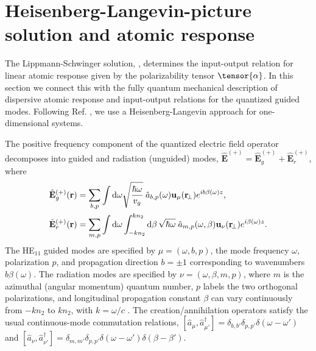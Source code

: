 \documentclass[preprint, aps,pra,onecolumn]{revtex4-1} %
\newcommand{\awg}{\hat{a}_{b,p}(\omega)}
\newcommand{\awr}{\hat{a}_{m,p}(\omega,\beta)}
\begin{document}
	
\section{Heisenberg-Langevin-picture solution and atomic response} \label{Sec::HeisenbergLangevin}
	
The Lippmann-Schwinger solution, , determines the input-output relation for linear atomic response given by the polarizability tensor $\tensor{\alpha}$.  
In this section we connect this with the fully quantum mechanical description of dispersive atomic response and input-output relations for the quantized guided modes.  
Following Ref. \cite{le_kien_spontaneous_2005}, we use a Heisenberg-Langevin approach for one-dimensional systems.  

The positive frequency component of the quantized electric field operator decomposes into guided and radiation (unguided) modes, $\hat{\mathbf{E}}^{(+)}=\hat{\mathbf{E}}_g^{(+)}+\hat{\mathbf{E}}_{r}^{(+)}$, where
	\begin{align}
		\hat{\mathbf{E}}_g^{(+)}(\br) &= \sum_{b,p} \int \mathrm{d}\omega  \sqrt{\frac{ \hbar \omega}{ v_g}} \; \awg \mathbf{u}_\mu (\br\!_\perp) e^{i b\beta(\omega) z } ,\label{Eq::QuantizedElectricField} \\
		\hat{\mathbf{E}}_r^{(+)}(\br) &= \sum_{m,p} \int \mathrm{d}\omega   \int_{-kn_2}^{kn_2}\mathrm{d}\beta \, \sqrt{ \hbar \omega}\;\awr \mathbf{u}_\nu (\br\!_\perp) e^{i\beta(\omega) z }.
	\end{align}
The HE$_{11}$ guided modes are specified by $\mu =(\omega, b, p)$, the mode frequency $\omega$,  polarization $p$, and propagation direction $b=\pm1$ corresponding to wavenumbers $b \beta (\omega)$.  
The radiation modes are specified by  $\nu=(\omega, \beta, m, p)$, where $m$ is the azimuthal (angular momentum) quantum number, $p$ labels the two orthogonal polarizations, and longitudinal propagation constant $\beta$ can vary continuously from $-kn_2$ to $kn_2$, with $k = \omega/c$ \cite{sondergaard_general_2001,le_kien_spontaneous_2005}.  
The creation/annihilation operators satisfy the usual continuous-mode commutation relations, $[\hat{a}_\mu, \hat{a}^\dag_{\mu'} ] = \delta_{b,b'} \delta_{p,p'} \delta ( \omega - \omega ') $ and $[\hat{a}_\nu ,\hat{a}^\dag_{\nu'} ] = \delta_{m,m'} \delta_{p,p'} \delta ( \omega - \omega ')  \delta ( \beta - \beta') $.
\end{document}
